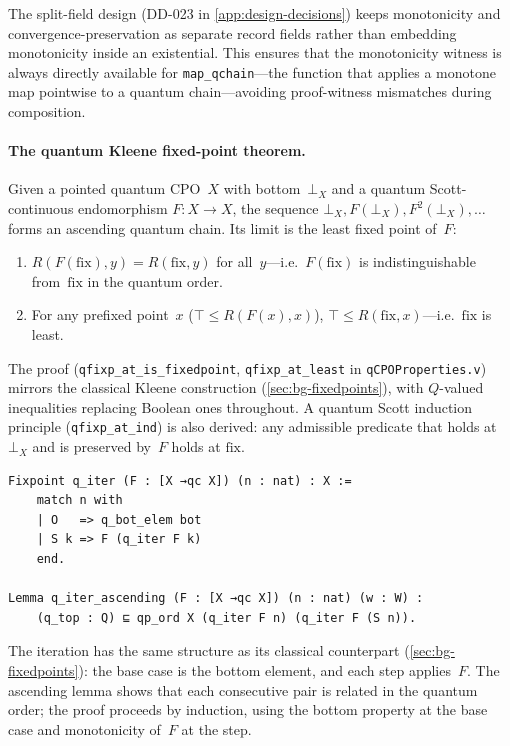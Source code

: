 \noindent
The split-field design (DD-023 in \cref{app:design-decisions}) keeps
monotonicity and convergence-preservation as separate record fields
rather than embedding monotonicity inside an existential.  This
ensures that the monotonicity witness is always directly available
for \texttt{map\_qchain}---the function that applies a monotone
map pointwise to a quantum chain---avoiding proof-witness mismatches
during composition.

\paragraph{The quantum Kleene fixed-point theorem.}
Given a pointed quantum CPO~$X$ with bottom~$\bot_X$ and a
quantum Scott-continuous endomorphism $F : X \to X$, the sequence
$\bot_X, F(\bot_X), F^2(\bot_X), \ldots$ forms an ascending quantum
chain.
Its limit is the least fixed point of~$F$:
\begin{enumerate}
  \item $R(F(\mathrm{fix}), y) = R(\mathrm{fix}, y)$
    for all~$y$---i.e.\ $F(\mathrm{fix})$ is indistinguishable
    from~$\mathrm{fix}$ in the quantum order.
  \item For any prefixed point~$x$
    ($\top \leq R(F(x), x)$),
    $\top \leq R(\mathrm{fix}, x)$---i.e.\ $\mathrm{fix}$ is least.
\end{enumerate}
The proof (\texttt{qfixp\_at\_is\_fixedpoint},
\texttt{qfixp\_at\_least} in \texttt{qCPOProperties.v})
mirrors the classical Kleene construction
(\cref{sec:bg-fixedpoints}), with $Q$-valued inequalities
replacing Boolean ones throughout.
A quantum Scott induction principle (\texttt{qfixp\_at\_ind}) is
also derived: any admissible predicate that holds at~$\bot_X$ and is
preserved by~$F$ holds at $\mathrm{fix}$.

\begin{lstlisting}[caption={Kleene iteration and ascending chain
  (\texttt{qCPOProperties.v}).},
                    label={lst:qiter}]
Fixpoint q_iter (F : [X →qc X]) (n : nat) : X :=
    match n with
    | O   => q_bot_elem bot
    | S k => F (q_iter F k)
    end.

Lemma q_iter_ascending (F : [X →qc X]) (n : nat) (w : W) :
    (q_top : Q) ⊑ qp_ord X (q_iter F n) (q_iter F (S n)).
\end{lstlisting}

\noindent
The iteration has the same structure as its classical counterpart
(\cref{sec:bg-fixedpoints}): the base case is the bottom element,
and each step applies~$F$.  The ascending lemma shows that each
consecutive pair is related in the quantum order; the proof proceeds
by induction, using the bottom property at the base case and
monotonicity of~$F$ at the step.

